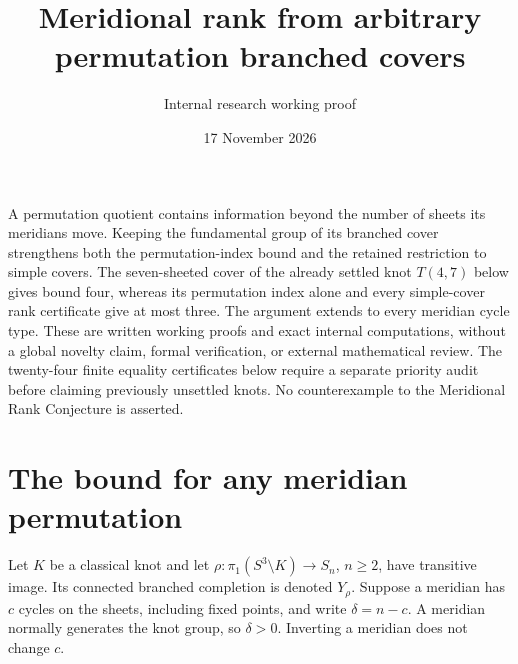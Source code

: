 \documentclass[11pt]{article}
\title{Meridional rank from arbitrary permutation branched covers}
\author{Internal research working proof}
\date{17 November 2026}
\begin{document}
\maketitle

A permutation quotient contains information beyond the number of sheets
its meridians move. Keeping the fundamental group of its branched cover
strengthens both the permutation-index bound and the retained restriction
to simple covers. The seven-sheeted cover of the already settled knot
$T(4,7)$ below gives bound four, whereas its permutation index alone and
every simple-cover rank certificate give at most three.
The argument extends to every meridian cycle type. These are written
working proofs and exact internal computations, without a global novelty
claim, formal verification, or external mathematical review. The twenty-four finite equality certificates below require a separate
priority audit before claiming previously unsettled knots. No
counterexample to the Meridional Rank Conjecture is asserted.

\section{The bound for any meridian permutation}

Let $K$ be a classical knot and let
$\rho:\pi_1(S^3\setminus K)\to S_n$, $n\ge2$, have transitive image.
Its connected branched completion is denoted $Y_\rho$.
Suppose a meridian has $c$ cycles on the sheets, including fixed points,
and write $\delta=n-c$. A meridian normally generates the knot group,
so $\delta>0$. Inverting a meridian does not change $c$.
\end{document}
